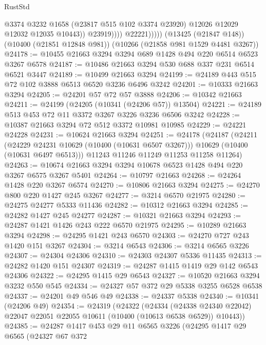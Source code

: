 \begin{lexlean}{RustStd}
\begin{coremodule}
                          @3374
                          @3232
                          @1658
                          (@23817 @515 @102 @3374 @23920)
                          @12026
                          @12029
                          @12032
                          @12035
                          @10443))
                      @23919))))
              @22221)))))
    (@13425 (@21847 @148))
    (@10400 (@21851 @12848 @981))
    (@10266 (@21858 @981 @1529 @4481 @3267))
@24178 := @10455 @21663 @3294 @3294 @689 @1428 @494 @220 @6514 @6523 @3267 @6578
@24187 := @10486 @21663 @3294 @530 @688 @337 @231 @6514 @6521 @3447
@24189 := @10499 @21663 @3294
@24199 := @24189 @443 @515 @72 @102 @3888 @6513 @6520 @3236 @6496 @3242
@24201 := @10333 @21663 @3294
@24205 := @24201 @57 @72 @57 @3888
@24206 := @10342 @21663
@24211 := @24199 (@24205 (@10341 (@24206 @57)) @13504)
@24221 := @24189 @513 @453 @72 @11 @3372 @3267 @3226 @3236 @6506 @3242
@24228 := @10387 @21663 @3294 @72 @512 @3372 @10981 @10985
@24229 := @24221 @24228
@24231 := @10624 @21663 @3294
@24251 := @24178
    (@24187
      (@24211
        (@24229 @24231 @10629 (@10400 (@10631 @6507 @3267)))
        @10629
        (@10400 (@10631 @6497 @6513)))
      @11243
      @11246
      @11249
      @11253
      @11258
      @11264)
@24263 := @10674 @21663 @3294 @3294 @10678 @6523 @1428 @494 @220 @3267 @6575 @3267 @5401
@24264 := @10797 @21663
@24268 := @24264 @1428 @220 @3267 @6574
@24270 := @10806 @21663 @3294
@24275 := @24270 @800 @220 @1427 @245 @3267
@24277 := @3214 @6570 @21975
@24280 := @24275 @24277 @5333 @11436
@24282 := @10312 @21663 @3294
@24285 := @24282 @1427 @245 @24277
@24287 := @10321 @21663 @3294
@24293 := @24287 @1421 @1426 @243 @222 @6570 @21975
@24295 := @10289 @21663 @3294
@24298 := @24295 @1421 @243 @6570
@24303 := @24270 @727 @243 @1420 @151 @3267
@24304 := @3214 @6543
@24306 := @3214 @6565 @3226
@24307 := @24304 @24306
@24310 := @24303 @24307 @5336 @11435
@24313 := @24282 @1420 @151 @24307
@24319 := @24287 @1415 @1419 @29 @142 @6543 @24306
@24322 := @24295 @1415 @29 @6543
@24327 := @10520 @21663 @3294 @3232 @550 @545
@24334 := @24327 @57 @372 @29 @5338 @3255 @6528 @6538
@24337 := @24201 @49 @546 @49
@24338 := @24337 @5338
@24340 := @10341 (@24206 @49)
@24354 := @24319
    (@24322
      (@24334
        (@24338 @24340 @22042)
        @22047
        @22051
        @22055
        @10611
        (@10400 (@10613 @6538 @6529))
        @10443))
@24385 := @24287
    @1417
    @453
    @29
    @11
    @6565
    @3226
    (@24295
      @1417
      @29
      @6565
      (@24327
        @67
        @372

\end{coremodule}
\end{lexlean}
